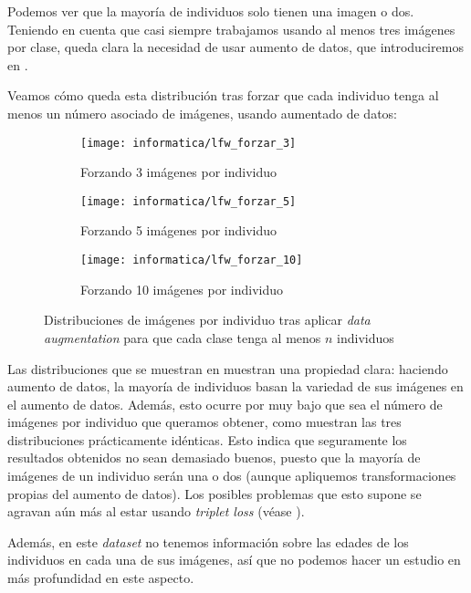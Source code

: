 Podemos ver que la mayoría de individuos solo tienen una imagen o dos. Teniendo en cuenta que casi siempre trabajamos usando al menos tres imágenes por clase, queda clara la necesidad de usar aumento de datos, que introduciremos en .

Veamos cómo queda esta distribución tras forzar que cada individuo tenga al menos un número asociado de imágenes, usando aumentado de datos:

\begin{figure}[H]
\centering
    \begin{subfigure}{0.5\textwidth}
        \centering
        \texttt{[image: informatica/lfw\_forzar\_3]}
        \caption{Forzando 3 imágenes por individuo }
    \end{subfigure}%
    \begin{subfigure}{.5\textwidth}
        \centering
        \texttt{[image: informatica/lfw\_forzar\_5]}
        \caption{Forzando 5 imágenes por individuo}
    \end{subfigure}

    \begin{subfigure}{.5\textwidth}
        \centering
        \texttt{[image: informatica/lfw\_forzar\_10]}
        \caption{Forzando 10 imágenes por individuo }
    \end{subfigure}

    \caption{Distribuciones de imágenes por individuo tras aplicar \textit{data augmentation} para que cada clase tenga al menos $n$ individuos}
    \label{img:distribuciones_forzar_data_augmentation}
\end{figure}

Las distribuciones que se muestran en  muestran una propiedad clara: haciendo aumento de datos, la mayoría de individuos basan la variedad de sus imágenes en el aumento de datos. Además, esto ocurre por muy bajo que sea el número de imágenes por individuo que queramos obtener, como muestran las tres distribuciones prácticamente idénticas. Esto indica que seguramente los resultados obtenidos no sean demasiado buenos, puesto que la mayoría de imágenes de un individuo serán una o dos  (aunque apliquemos transformaciones propias del aumento de datos). Los posibles problemas que esto supone se agravan aún más al estar usando \textit{triplet loss} (véase ).

Además, en este \textit{dataset} no tenemos información sobre las edades de los individuos en cada una de sus imágenes, así que no podemos hacer un estudio en más profundidad en este aspecto.

